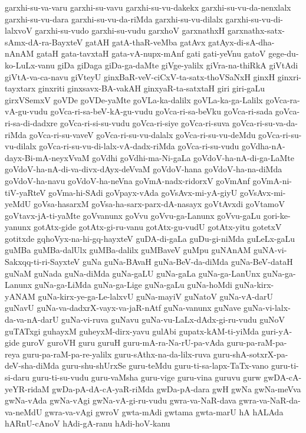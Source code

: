 {garxhi-su-va-varu
garxhi-su-vavu
garxhi-su-vu-dakekx
garxhi-su-vu-da-nenxlalx
garxhi-su-vu-dara
garxhi-su-vu-da-riMda
garxhi-su-vu-dilalx
garxhi-su-vu-di-lalxvoV
garxhi-su-vudo
garxhi-su-vudu
garxhoV
garxnathxH
garxnathx-satx-sAmx-dA-ra-BayxteV
gatAH
gatA-thaR-veMba
gatAvx
gatAyx-di-sA-dha-nAnAM
gataH
gata-tavxtaH
gata-vA-nupx-mAnf
gati
gati-yeVnu
gatoV
gege-du-ko-LuLx-vanu
giDa
giDaga
giDa-ga-daMte
giVge-yalilx
giVra-na-thiRkA
giVtAdi
giVtA-va-ca-navu
giVteyU
ginxBaR-veV-ciCxV-ta-satx-thoVSaNxH
ginxH
ginxri-tayxtarx
ginxriti
ginxsavx-BA-vakAH
ginxyaR-ta-satxtaH
giri
giri-gaLu
girxVSemxV
goVDe
goVDe-yaMte
goVLa-ka-dalilx
goVLa-ka-ga-Lalilx
goVca-ra-vA-gu-vudu
goVca-ri-sa-beV-kA-gu-vudu
goVca-ri-sa-beVku
goVca-ri-sada
goVca-ri-sa-di-dadxre
goVca-ri-si-su-vudu
goVca-ri-siye
goVca-ri-suva
goVca-ri-su-va-da-riMda
goVca-ri-su-vaveV
goVca-ri-su-vu-dalalx
goVca-ri-su-vu-deMdu
goVca-ri-su-vu-dilalx
goVca-ri-su-vu-di-lalx-vA-dadx-riMda
goVca-ri-su-vudu
goVdha-nA-dayx-Bi-mA-neyxVvaM
goVdhi
goVdhi-ma-Ni-gaLa
goVdoV-ha-nA-di-ga-LaMte
goVdoV-ha-nA-di-va-divx-dAyx-deVvaM
goVdoV-hana
goVdoV-ha-na-diMda
goVdoV-ha-navu
goVdoV-ha-neVna
goVmA-nadx-ridorxV
goVmAnf
goVmA-ni-tiV-yaRteV
goVma-hi-SAdi
goVpayx-vAda
goVsAvx-mi-yA-giyU
goVsAvx-mi-yeMdU
goVsa-hasarxM
goVsa-ha-sarx-parx-dA-nasayx
goVtAvxdi
goVtamoV
goVtavx-jA-ti-yaMte
goVvanunx
goVvu
goVvu-ga-Lanunx
goVvu-gaLu
gori-ke-yanunx
gotAtx-gide
gotAtx-gi-ru-vanu
gotAtx-gu-vudU
gotAtx-yitu
gotetxV
gotitxde
gqhoVyx-na-hi-gq-hayxteV
guDA-di-gaLa
guDu-gi-niMda
guLeLx-gaLu
guMBa
guMBa-dalUlx
guMBa-dalilx
guMBaveV
guMpu
guNAnAM
guNA-vi-Sakxqq-ti-ri-SayxteV
guNa
guNa-BAvaH
guNa-BeV-da-diMda
guNa-BeV-dataH
guNaM
guNada
guNa-diMda
guNa-gaLU
guNa-gaLa
guNa-ga-LanUnx
guNa-ga-Lanunx
guNa-ga-LiMda
guNa-ga-Lige
guNa-gaLu
guNa-hoMdi
guNa-kirx-yANAM
guNa-kirx-ye-ga-Le-lalxvU
guNa-mayiV
guNatoV
guNa-vA-darU
guNavU
guNa-va-dadxrX-vayx-va-jaR-nAtf
guNa-vanunx
guNave
guNa-vi-lalx-da-va-nA-darU
guNa-vi-ruva
guNavu
guNa-vu-LaLx-dAdx-gi-ru-vudu
guNoV
guTATxgi
guhayxM
guheyxM-dirx-yavu
gulAbi
gupatx-kAM-ti-yiMda
guri-yA-gide
guroV
guroVH
guru
guruH
guru-mA-ra-Na-rU-pa-vAda
guru-pa-raM-pa-reya
guru-pa-raM-pa-re-yalilx
guru-sAthx-na-da-lilx-ruva
guru-shA-sotxrX-pa-deV-sha-diMda
guru-shu-shUrxSe
guru-teMdu
guru-ti-sa-lapx-TaTx-vano
guru-ti-si-daru
guru-ti-su-vudu
guru-vaMsha
guru-vige
guru-vina
guruvu
gurw
gwDA-cA-yeYR-ridaM
gwDa-pA-dA-cA-yaR-riMda
gwDa-pA-dara
gwH
gwNa
gwNa-meVva
gwNa-vAda
gwNa-vAgi
gwNa-vA-gi-ru-vudu
gwra-va-NaR-dava
gwra-va-NaR-da-va-neMdU
gwra-va-vAgi
gwroV
gwta-mAdi
gwtama
gwta-marU
hA
hALAda
hARnU-cAnoV
hAdi-gA-ranu
hAdi-hoV-kanu
}

